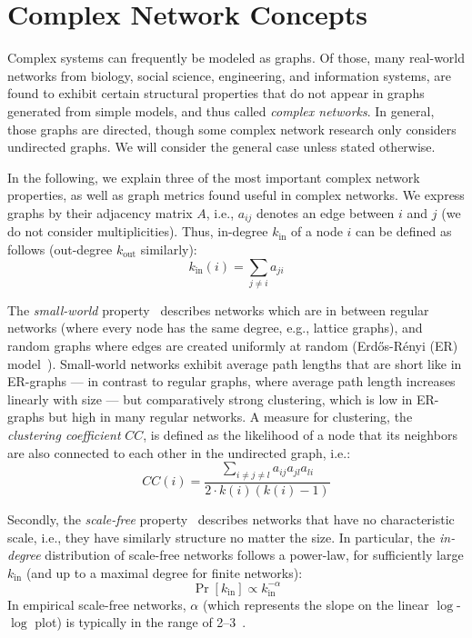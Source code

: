 \section{Complex Network Concepts}\label{sec:background}
Complex systems can frequently be modeled as graphs.
Of those, many real-world networks from biology, social science, engineering, and information systems,
are found to exhibit certain structural properties that do not appear in graphs generated from simple models,
and thus called \emph{complex networks}.
In general, those graphs are directed,
though some complex network research only considers undirected graphs.
We will consider the general case unless stated otherwise.

In the following, we explain three of the most important complex network properties,
as well as graph metrics found useful in complex networks.
We express graphs by their adjacency matrix $A$, i.e., $a_{ij}$ denotes an edge between $i$ and $j$ (we do not consider multiplicities).
Thus, in-degree $k_\text{in}$ of a node $i$ can be defined as follows
(out-degree $k_\text{out}$ similarly):
\begin{equation}
    k_\text{in}(i) = \sum_{j\neq i}{a_{ji}}
\end{equation}

The \emph{small-world} property~\cite{SmallWorld1998Watts} describes networks which are in between regular networks
(where every node has the same degree, e.g., lattice graphs),
and random graphs where edges are created uniformly at random (Erd\H{o}s-R\'enyi (ER) model~\cite{RandomGraph1959Erdos}).
Small-world networks exhibit average path lengths
that are short like in ER-graphs ---
in contrast to regular graphs, where average path length increases linearly with size ---
but comparatively strong clustering, which is low in ER-graphs but high in many regular networks.
A measure for clustering, the \emph{clustering coefficient} $CC$,
is defined as the likelihood of a node that its neighbors are also connected to each other in the undirected graph,
i.e.:
\begin{equation}
    CC(i) = \frac{\sum_{i\neq j\neq l}{a_{ij}a_{jl}a_{li}}}{2\cdot k(i)(k(i) - 1)}
\end{equation}

Secondly, the \emph{scale-free} property~\cite{ScaleFree1999Albert} describes networks that have no characteristic scale,
i.e., they have similarly structure no matter the size.
In particular,
the \emph{in-degree} distribution of scale-free networks follows a power-law,
for sufficiently large $k_\text{in}$ (and up to a maximal degree for finite networks):
\begin{equation}
    \Pr[k_\text{in}] \propto k_\text{in}^{-\alpha}
\end{equation}
In empirical scale-free networks, $\alpha$ (which represents the slope on the linear $\log$-$\log$ plot) is typically in the range of \numrange{2}{3}~\cite{PowlawEmpiric2009Clauset}.

